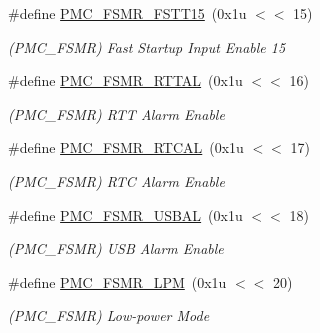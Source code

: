\begin{DoxyCompactItemize}
\mbox{\label{group__SAMS70__PMC_ga8a3c7b207ee6621a33cd069df0a57575}} 
\#define \mbox{\hyperlink{group__SAMS70__PMC_ga8a3c7b207ee6621a33cd069df0a57575}{P\+M\+C\+\_\+\+F\+S\+M\+R\+\_\+\+F\+S\+T\+T15}}~(0x1u $<$$<$ 15)
\begin{DoxyCompactList}\small\item\em (P\+M\+C\+\_\+\+F\+S\+MR) Fast Startup Input Enable 15 \end{DoxyCompactList}\item 
\mbox{\label{group__SAMS70__PMC_ga3dbc26d096503b7121ca9e3fa7f94174}} 
\#define \mbox{\hyperlink{group__SAMS70__PMC_ga3dbc26d096503b7121ca9e3fa7f94174}{P\+M\+C\+\_\+\+F\+S\+M\+R\+\_\+\+R\+T\+T\+AL}}~(0x1u $<$$<$ 16)
\begin{DoxyCompactList}\small\item\em (P\+M\+C\+\_\+\+F\+S\+MR) R\+TT Alarm Enable \end{DoxyCompactList}\item 
\mbox{\label{group__SAMS70__PMC_ga369c2d741e5ae3b191e5c7d37c9c6537}} 
\#define \mbox{\hyperlink{group__SAMS70__PMC_ga369c2d741e5ae3b191e5c7d37c9c6537}{P\+M\+C\+\_\+\+F\+S\+M\+R\+\_\+\+R\+T\+C\+AL}}~(0x1u $<$$<$ 17)
\begin{DoxyCompactList}\small\item\em (P\+M\+C\+\_\+\+F\+S\+MR) R\+TC Alarm Enable \end{DoxyCompactList}\item 
\mbox{\label{group__SAMS70__PMC_ga2205d0a70bd2d92ff7c5e0316e132d0d}} 
\#define \mbox{\hyperlink{group__SAMS70__PMC_ga2205d0a70bd2d92ff7c5e0316e132d0d}{P\+M\+C\+\_\+\+F\+S\+M\+R\+\_\+\+U\+S\+B\+AL}}~(0x1u $<$$<$ 18)
\begin{DoxyCompactList}\small\item\em (P\+M\+C\+\_\+\+F\+S\+MR) U\+SB Alarm Enable \end{DoxyCompactList}\item 
\mbox{\label{group__SAMS70__PMC_gac6c8b1159a9727ccc4ebf3cc2adb7e76}} 
\#define \mbox{\hyperlink{group__SAMS70__PMC_gac6c8b1159a9727ccc4ebf3cc2adb7e76}{P\+M\+C\+\_\+\+F\+S\+M\+R\+\_\+\+L\+PM}}~(0x1u $<$$<$ 20)
\begin{DoxyCompactList}\small\item\em (P\+M\+C\+\_\+\+F\+S\+MR) Low-\/power Mode \end{DoxyCompactList}\item 
$$
\end{DoxyCompactItemize}
